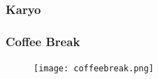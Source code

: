 \begin{frame}[c]\frametitle{Karyo}
\end{frame}

\beginbackup

\begin{frame}[c]\frametitle{Coffee Break}
  \begin{figure}[htbp]
    \centering
    \texttt{[image: coffeebreak.png]}
  \end{figure}
\end{frame}

\backupend

